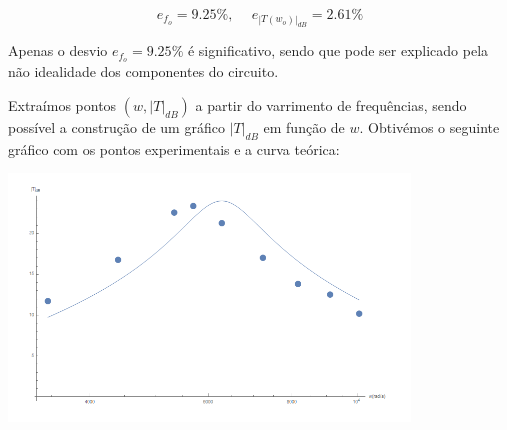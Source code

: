 \documentclass[a4paper,11pt]{report}
\begin{document}
$$e_{f_o}=9.25\%, \hspace{15pt} e_{|T(w_o)|_{dB}}=2.61\%$$

Apenas o desvio $e_{f_o}=9.25\%$ é significativo, sendo que pode ser explicado pela não idealidade dos componentes do circuito.

Extraímos pontos $(w,|T|_{dB})$ a partir do varrimento de frequências, sendo possível a construção de um gráfico $|T|_{dB}$ em função de $w$. Obtivémos o seguinte gráfico com os pontos experimentais e a curva teórica:


\begin{center}
    \includegraphics[angle=0,width=0.8\textwidth]{XXX.png}
    \label{fig:XXX}
    \end{center}
\end{document}
